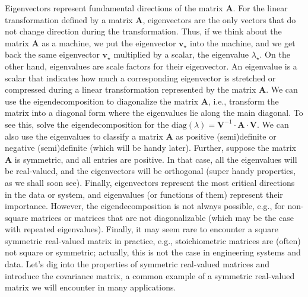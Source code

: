 \documentclass{article}[11pt]
\begin{document}
Eigenvectors represent fundamental directions of the matrix $\mathbf{A}$. For the linear transformation defined by a matrix $\mathbf{A}$, eigenvectors are the only vectors that do not change direction during the transformation. 
Thus, if we think about the matrix $\mathbf{A}$ as a machine, we put the eigenvector $\mathbf{v}_{\star}$ into the machine, and we get back the same eigenvector $\mathbf{v}_{\star}$ multiplied by a scalar, the eigenvalue $\lambda_{\star}$.
On the other hand, eigenvalues are scale factors for their eigenvector. An eigenvalue is a scalar that indicates how much a corresponding eigenvector is stretched or compressed during a linear transformation represented by the matrix $\mathbf{A}$.
We can use the eigendecomposition to diagonalize the matrix $\mathbf{A}$, i.e., transform the matrix into a diagonal form where the eigenvalues lie along the main diagonal. To see this, solve the eigendecomposition for the $\text{diag}(\lambda) = \mathbf{V}^{-1}\cdot\mathbf{A}\cdot\mathbf{V}$. 
We can also use the eigenvalues to classify a matrix $\mathbf{A}$ as positive (semi)definite or negative (semi)definite (which will be handy later). 
Further, suppose the matrix $\mathbf{A}$ is symmetric, and all entries are positive. In that case, all the eigenvalues will be real-valued, and the eigenvectors will be orthogonal (super handy properties, as we shall soon see).
Finally, eigenvectors represent the most critical directions in the data or system, and eigenvalues (or functions of them) represent their importance. However, the eigendecomposition is not always possible, e.g., for non-square matrices or matrices that are not diagonalizable (which may be the case with repeated eigenvalues). Finally, it may seem rare to encounter a square symmetric real-valued matrix in practice, e.g., stoichiometric matrices are (often) not square or symmetric; actually, this is not the case in engineering systems and data. Let's dig into the properties of symmetric real-valued matrices and introduce the covariance matrix, a common example of a symmetric real-valued matrix we will encounter in many applications.
\end{document}
